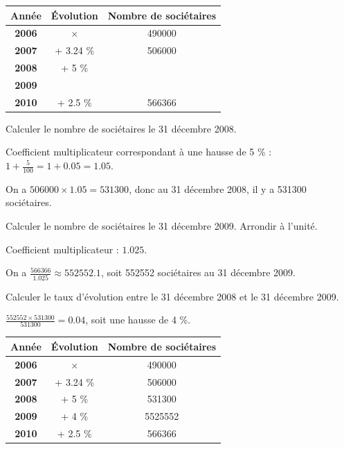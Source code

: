 \documentclass[a4paper,11pt]{exam}
\begin{document}
\begin{tabular}{|c|c|c|}
	\hline
	\textbf{Année} & \textbf{\'Evolution} & \textbf{Nombre de sociétaires} \\
	\hline
	\textbf{2006} & {\LARGE $\times$} & \num{490000} \\
	\hline
	\textbf{2007} & + \num{3.24} \% & \num{506000}\\
	\hline
	\textbf{2008} & + \num{5} \% & \\
	\hline
	\textbf{2009} & &  \\
	\hline
	\textbf{2010} & + \num{2.5} \% & \num{566366} \\
	\hline
	
\end{tabular}

\begin{questions}
	\question Calculer le nombre de sociétaires le 31 décembre 2008.
	\begin{solution}
		Coefficient multiplicateur correspondant  à une hausse de \num{5} \% : $1 + \frac{5}{100}=1+\num{0.05}=\num{1.05}$.
		
		On a $\num{506000} \times \num{1.05} = \num{531300}$, donc au 31 décembre 2008, il y a \num{531300} sociétaires.
	\end{solution}
	
	\question Calculer le nombre de sociétaires le 31 décembre 2009. Arrondir à l'unité.
	\begin{solution}
		Coefficient multiplicateur : $\num{1.025}$.
		
		On a $\frac{\num{566366}}{\num{1.025}}  \approx \num{552552.1}$, soit \num{552552} sociétaires au 31 décembre 2009.
	\end{solution}
	
	\question Calculer le taux d'évolution entre le 31 décembre 2008 et le 31 décembre 2009.
	\begin{solution}
		$\frac{\num{552552} \times \num{531300}}{\num{531300}} = \num{0.04}$, soit une hausse de 4 \%.
		
		\begin{tabular}{|c|c|c|}
			\hline
			\textbf{Année} & \textbf{\'Evolution} & \textbf{Nombre de sociétaires} \\
			\hline
			\textbf{2006} & {\LARGE $\times$} & \num{490000} \\
			\hline
			\textbf{2007} & + \num{3.24} \% & \num{506000}\\
			\hline
			\textbf{2008} & + \num{5} \% & \num{531300}\\
			\hline
			\textbf{2009} & + \num{4} \% & \num{5525552} \\
			\hline
			\textbf{2010} & + \num{2.5} \% & \num{566366} \\
			\hline
			

\end{tabular}
\end{solution}
\end{questions}
\end{document}
